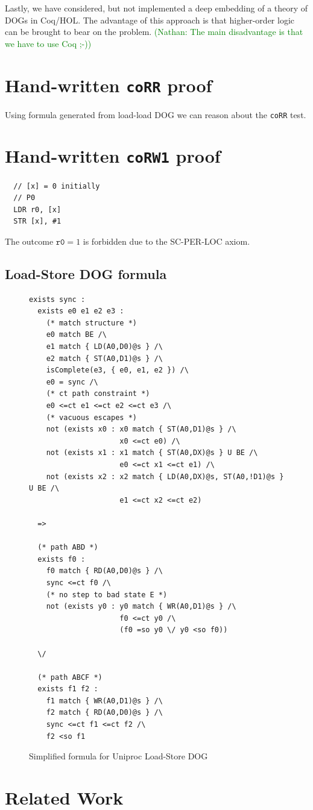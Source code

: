 \documentclass[10pt]{paper}
\newcommand{\axiom}[1]{\textsc{#1}}
\newcommand{\litmus}[1]{\texttt{#1}}
\newcommand{\NCComment}[1]{\textcolor{green}{(Nathan: #1)}}
\begin{document}
Lastly, we have considered, but not implemented a deep embedding of a theory of DOGs in Coq/HOL.
%
The advantage of this approach is that higher-order logic can be brought to bear on the problem.
%
\NCComment{The main disadvantage is that we have to use Coq ;-)}

\section{Hand-written \litmus{coRR} proof}
%
Using formula generated from load-load DOG we can reason about the \litmus{coRR} test.

\section{Hand-written \litmus{coRW1} proof}

\begin{verbatim}
  // [x] = 0 initially
  // P0
  LDR r0, [x]
  STR [x], #1
\end{verbatim}

The outcome $\texttt{r0} = 1$ is forbidden due to the \axiom{SC-PER-LOC} axiom.

\subsection{Load-Store DOG formula}

\begin{figure}[p]
\begin{verbatim}
exists sync :
  exists e0 e1 e2 e3 :
    (* match structure *)
    e0 match BE /\
    e1 match { LD(A0,D0)@s } /\
    e2 match { ST(A0,D1)@s } /\
    isComplete(e3, { e0, e1, e2 }) /\
    e0 = sync /\
    (* ct path constraint *)
    e0 <=ct e1 <=ct e2 <=ct e3 /\
    (* vacuous escapes *)
    not (exists x0 : x0 match { ST(A0,D1)@s } /\
                     x0 <=ct e0) /\
    not (exists x1 : x1 match { ST(A0,DX)@s } U BE /\
                     e0 <=ct x1 <=ct e1) /\
    not (exists x2 : x2 match { LD(A0,DX)@s, ST(A0,!D1)@s } U BE /\
                     e1 <=ct x2 <=ct e2)

  =>

  (* path ABD *)
  exists f0 :
    f0 match { RD(A0,D0)@s } /\
    sync <=ct f0 /\
    (* no step to bad state E *)
    not (exists y0 : y0 match { WR(A0,D1)@s } /\
                     f0 <=ct y0 /\
                     (f0 =so y0 \/ y0 <so f0))

  \/

  (* path ABCF *)
  exists f1 f2 :
    f1 match { WR(A0,D1)@s } /\
    f2 match { RD(A0,D0)@s } /\
    sync <=ct f1 <=ct f2 /\
    f2 <so f1
\end{verbatim}
\caption{Simplified formula for Uniproc Load-Store DOG}
\label{fig:loadstore-formula}
\end{figure}


\section{Related Work}



\end{document}
